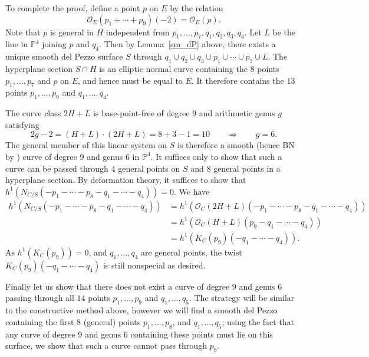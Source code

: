 \documentclass[11pt]{amsart}
\newcommand{\pp}{\mathbb{P}}
\renewcommand{\O}{\mathcal{O}}
\theoremstyle{definition}
\theoremstyle{remark}
\begin{document}
To complete the proof, define a point $p$ on $E$ by the relation
\[\O_E(p_1 + \cdots + p_9)(-2) = \O_E(p).\]
Note that $p$ is general in $H$ independent from $p_1, \ldots, p_7, q_1, q_2, q_3, q_4$.
Let $L$ be the line in $\pp^4$ joining $p$ and $q_4$.  Then by Lemma~\ref{sm_dP} above, there exists a unique smooth del Pezzo surface $S$ through $q_1 \cup q_2 \cup q_3 \cup p_1 \cup \cdots \cup p_7 \cup L$.  The hyperplane section $S \cap H$ is an elliptic normal curve containing the $8$ points $p_1, \ldots, p_7$ and $p$ on $E$, and hence must be equal to $E$.  It therefore contains the $13$ points $p_1, \ldots, p_9$ and $q_1, \ldots, q_4$.

The curve class $2H + L$ is base-point-free of degree $9$ and arithmetic genus $g$ satisfying
\[2g - 2 = (H + L)\cdot (2H+L) = 8 + 3 - 1 =10 \qquad \Rightarrow \qquad g = 6. \]
The general member of this linear system on $S$ is therefore a smooth (hence BN by \cite{iliev}) curve of degree $9$ and genus $6$ in $\pp^4$.  It suffices only to show that such a curve can be passed through $4$ general points on $S$ and $8$ general points in a hyperplane section.  By deformation theory, it suffices to show that $h^1(N_{C/S}(-p_1-\cdots-p_8 - q_1 - \cdots - q_4)) = 0$.  We have
\begin{align*}
h^1(N_{C/S}(-p_1-\cdots-p_8 - q_1 - \cdots - q_4)) &= h^1(\O_C(2H+L)(-p_1-\cdots-p_8 - q_1 - \cdots - q_4)) \\
&=h^1(\O_C(H+L)(p_9- q_1 - \cdots - q_4)) \\
&= h^1(K_C(p_9)(-q_1 - \cdots - q_4)). 
\end{align*}
As $h^1(K_C(p_9)) = 0$, and $q_1, \ldots, q_4$ are general points, the twist $K_C(p_9)(-q_1-\cdots-q_4)$ is still nonspecial as desired.


Finally let us show that there does not exist a curve of degree $9$ and genus $6$ passing through all $14$ points $p_1, \ldots, p_9$ and $q_1, \ldots, q_5$.  The strategy will be similar to the constructive method above, however we will find a smooth del Pezzo containing the first $8$ (general) points $p_1, \ldots, p_8$, and $q_1, \ldots, q_5$; using the fact that any curve of degree $9$ and genus $6$ containing these points must lie on this surface, we show that such a curve cannot pass through $p_9$.
\end{document}
